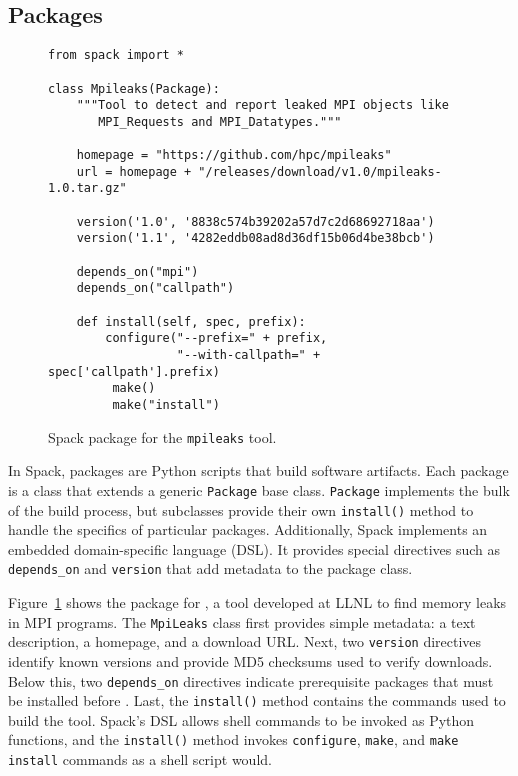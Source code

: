 
\subsection{Packages}

\begin{figure}
\begin{verbatim}
from spack import *

class Mpileaks(Package):
    """Tool to detect and report leaked MPI objects like
       MPI_Requests and MPI_Datatypes."""

    homepage = "https://github.com/hpc/mpileaks"
    url = homepage + "/releases/download/v1.0/mpileaks-1.0.tar.gz"

    version('1.0', '8838c574b39202a57d7c2d68692718aa')
    version('1.1', '4282eddb08ad8d36df15b06d4be38bcb')

    depends_on("mpi")
    depends_on("callpath")

    def install(self, spec, prefix):
        configure("--prefix=" + prefix,
                  "--with-callpath=" + spec['callpath'].prefix)
         make()
         make("install")
\end{verbatim}
	\caption{
		Spack package for the {\tt mpileaks} tool.
		\label{fig:mpileaks}
	}
\end{figure}

In Spack, packages are Python scripts that build software artifacts.  
Each package is a class that extends a generic {\tt Package}
base class.  {\tt Package} implements the bulk of the build process, but
subclasses provide their own {\tt install()} method to handle the
specifics of particular packages. Additionally,
Spack implements an embedded domain-specific language (DSL).  It provides
special directives such as {\tt depends\_on} and {\tt version} that add
metadata to the package class.

Figure~\ref{fig:mpileaks} shows the package for \mpileaks, a tool developed
at LLNL to find memory leaks in MPI programs.
The {\tt MpiLeaks} class first provides simple metadata: a text description,
a homepage, and a download URL.  
Next, two {\tt version} directives identify known versions and provide
MD5 checksums used to verify downloads.
Below this, two {\tt depends\_on}
directives indicate prerequisite packages that must be installed before \mpileaks.
Last, the {\tt install()} method contains the commands used to build
the tool.  Spack's DSL allows shell commands to be invoked as Python functions,
and the {\tt install()} method invokes {\tt configure},
{\tt make}, and {\tt make install} commands as a shell script would.





